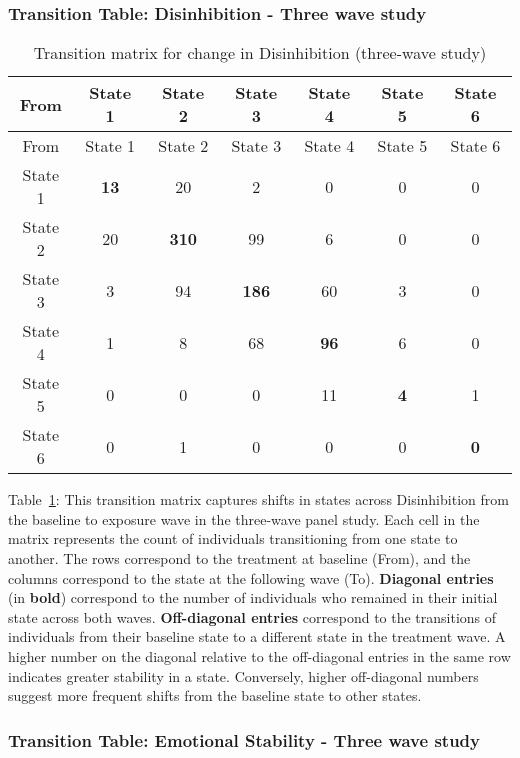 \documentclass[
  single column]{article}
\begin{document}
\subsubsection{Transition Table: Disinhibition - Three wave
study}\label{transition-table-disinhibition---three-wave-study}

\begin{longtable}[]{@{}ccccccc@{}}
\caption{Transition matrix for change in Disinhibition (three-wave
study)}\label{tbl-table-transition-disinhibition}\tabularnewline
\toprule\noalign{}
From & State 1 & State 2 & State 3 & State 4 & State 5 & State 6 \\
\midrule\noalign{}
\endfirsthead
\toprule\noalign{}
From & State 1 & State 2 & State 3 & State 4 & State 5 & State 6 \\
\midrule\noalign{}
\endhead
\bottomrule\noalign{}
\endlastfoot
State 1 & \textbf{13} & 20 & 2 & 0 & 0 & 0 \\
State 2 & 20 & \textbf{310} & 99 & 6 & 0 & 0 \\
State 3 & 3 & 94 & \textbf{186} & 60 & 3 & 0 \\
State 4 & 1 & 8 & 68 & \textbf{96} & 6 & 0 \\
State 5 & 0 & 0 & 0 & 11 & \textbf{4} & 1 \\
State 6 & 0 & 1 & 0 & 0 & 0 & \textbf{0} \\
\end{longtable}

Table~\ref{tbl-table-transition-disinhibition}: This transition matrix
captures shifts in states across Disinhibition from the baseline to
exposure wave in the three-wave panel study. Each cell in the matrix
represents the count of individuals transitioning from one state to
another. The rows correspond to the treatment at baseline (From), and
the columns correspond to the state at the following wave (To).
\textbf{Diagonal entries} (in \textbf{bold}) correspond to the number of
individuals who remained in their initial state across both waves.
\textbf{Off-diagonal entries} correspond to the transitions of
individuals from their baseline state to a different state in the
treatment wave. A higher number on the diagonal relative to the
off-diagonal entries in the same row indicates greater stability in a
state. Conversely, higher off-diagonal numbers suggest more frequent
shifts from the baseline state to other states.

\subsubsection{Transition Table: Emotional Stability - Three wave
study}\label{transition-table-emotional-stability---three-wave-study}
\end{document}
